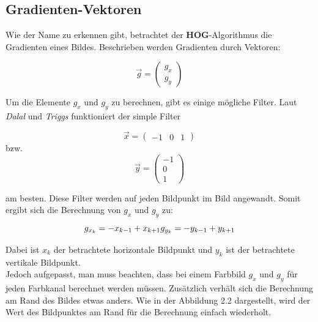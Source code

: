 \subsection{Gradienten-Vektoren}

Wie der Name zu erkennen gibt, betrachtet der \textbf{HOG}-Algorithmus die Gradienten eines Bildes. Beschrieben werden Gradienten durch Vektoren:

$$
\vec{g}=\begin{pmatrix}
	g_x \\
	g_y
\end{pmatrix}
$$

Um die Elemente $g_x$ und $g_y$ zu berechnen, gibt es einige mögliche Filter. Laut \emph{Dalal} und \emph{Triggs} \cite[S.5]{dalal:inria-00548512} funktioniert der simple Filter


$$
\vec{x}=\begin{pmatrix}
	-1 & 0 & 1
\end{pmatrix}
$$
bzw.\\
$$
\vec{y}=\begin{pmatrix}
	-1 \\
	0 \\
	1
\end{pmatrix}
$$

am besten.
Diese Filter werden auf jeden Bildpunkt im Bild angewandt. Somit ergibt sich die Berechnung von $g_x$ und $g_y$ zu:
\begin{equation*}
	g_{x_k}=-x_{k-1}+x_{k+1} \\
	g_{y_k}=-y_{k-1}+y_{k+1}
\end{equation*}

Dabei ist $x_k$ der betrachtete horizontale Bildpunkt und $y_k$ ist der betrachtete vertikale Bildpunkt.\\
Jedoch aufgepasst, man muss beachten, dass bei einem Farbbild $g_x$ und $g_y$ für jeden Farbkanal berechnet werden müssen. Zusätzlich verhält sich die Berechnung am Rand des Bildes etwas anders.
Wie in der Abbildung 2.2 dargestellt, wird der Wert des Bildpunktes am Rand für die Berechnung einfach wiederholt.


